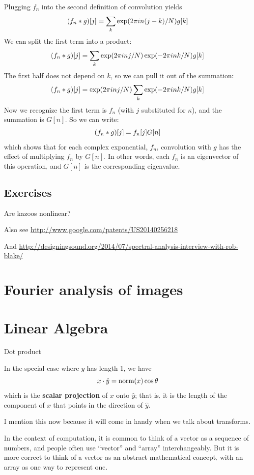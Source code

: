 \documentclass[12pt]{book}
\begin{document}
Plugging $f_n$ into the second definition of convolution yields
%
\[ (f_n \ast g)[j] = \sum_k \exp(2 \pi i n (j-k) / N) g[k]  \]
%
We can split the first term into a product:
%
\[ (f_n \ast g)[j] = \sum_k \exp(2 \pi i n j / N) \exp(-2 \pi i n k / N) g[k]  \]
%
The first half does not depend on $k$, so we can pull it out of the
summation:
%
\[ (f_n \ast g)[j] = \exp(2 \pi i n j / N) \sum_k \exp(-2 \pi i n k / N) g[k]  \]
%
Now we recognize the first term is $f_n$ (with $j$ substituted for
$\kappa$), and the summation is $G[n]$.  So we can write:
%
\[ (f_n \ast g)[j] = f_n[j] G[n] \]
%
which shows that for each complex exponential, $f_n$, convolution
with $g$ has the effect of multiplying $f_n$ by $G[n]$.  In other
words, each $f_n$ is an eigenvector of this operation, and
$G[n]$ is the corresponding eigenvalue.



\section{Exercises}

\begin{exercise}
Are kazoos nonlinear?

Also see \url{http://www.google.com/patents/US20140256218}

And \url{http://designingsound.org/2014/07/spectral-analysis-interview-with-rob-blake/}
\end{exercise}



\chapter{Fourier analysis of images}


\appendix

\chapter{Linear Algebra}

Dot product

In the special case where $y$ has length 1, we have 
%
\[ x \cdot \hat{y} = \mathrm{norm}(x) \cos \theta \]
%
which is the {\bf scalar projection} of $x$ onto $\hat{y}$;
that is, it is the length of the component of $x$ that points
in the direction of $\hat{y}$.

I mention this now because it will come in handy when we talk
about transforms.

In the context of computation, it is common to think of a vector as a
sequence of numbers, and people often use ``vector'' and ``array''
interchangeably.  But it is more correct to think of a vector as an
abstract mathematical concept, with an array as one way to represent
one.
\end{document}
